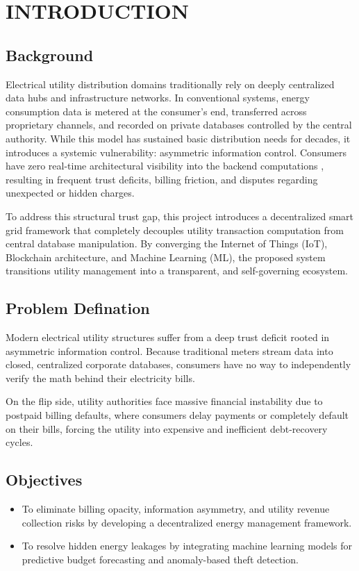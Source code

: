 \chapter{INTRODUCTION}
\section{Background}
Electrical utility distribution domains traditionally rely on deeply centralized data hubs and infrastructure networks.
In conventional systems, energy consumption data is metered at the consumer’s end, transferred across proprietary channels, and recorded on private databases controlled by the central authority.
While this model has sustained basic distribution needs for decades, it introduces a systemic vulnerability: asymmetric information control. Consumers have zero real-time architectural visibility into the backend computations , resulting in frequent trust deficits, billing friction, and disputes regarding unexpected or hidden charges. \cite{ref1}

To address this structural trust gap, this project introduces a decentralized smart grid framework that completely decouples utility transaction computation from central database manipulation. By converging the Internet of Things (IoT), Blockchain architecture, and Machine Learning (ML), the proposed system transitions utility management into a  transparent, and self-governing ecosystem.

\section{Problem Defination}
Modern electrical utility structures suffer from a deep trust deficit rooted in asymmetric information control. Because traditional meters stream data into closed, centralized 
corporate databases, consumers have no way to independently verify the math behind their electricity bills. 

On the flip side, utility authorities face massive financial instability due to postpaid billing defaults, where consumers delay payments or completely default on their bills, forcing the utility into expensive and inefficient debt-recovery cycles.

\section{Objectives}
\begin{itemize}
  \item To eliminate billing opacity, information asymmetry, and utility revenue collection risks by developing a decentralized energy management framework.
  \item To resolve hidden energy leakages by integrating machine learning models for predictive budget forecasting and anomaly-based theft detection.
\end{itemize}


